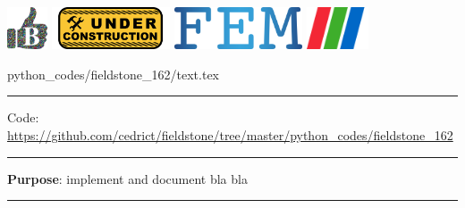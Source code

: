 \noindent
\includegraphics[height=1.25cm]{images/pictograms/benchmark}
\includegraphics[height=1.25cm]{images/pictograms/under_construction}
\includegraphics[height=1.25cm]{images/pictograms/FEM}
\includegraphics[height=1.25cm]{images/pictograms/paraview}


\begin{flushright} {\tiny {\color{gray} python\_codes/fieldstone\_162/text.tex}} \end{flushright}

%

\par\noindent\rule{\textwidth}{0.4pt}

\begin{center}
\inpython
{\small Code: \url{https://github.com/cedrict/fieldstone/tree/master/python_codes/fieldstone_162}}
\end{center}

\par\noindent\rule{\textwidth}{0.4pt}

{\bf \color{teal} Purpose}: implement and document bla bla 

\par\noindent\rule{\textwidth}{0.4pt}


